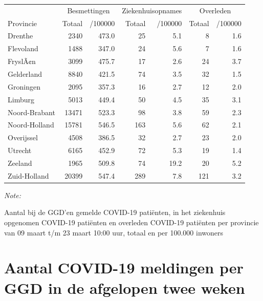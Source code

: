 \documentclass[
  english,
  man,floatsintext]{apa6}
\begin{document}
\begin{table}
\centering
\begin{threeparttable}
\begin{tabular}{lrrrrrr}
\toprule
\multicolumn{1}{c}{ } & \multicolumn{2}{c}{Besmettingen} & \multicolumn{2}{c}{Ziekenhuisopnames} & \multicolumn{2}{c}{Overleden} \\
\cmidrule(l{3pt}r{3pt}){2-3} \cmidrule(l{3pt}r{3pt}){4-5} \cmidrule(l{3pt}r{3pt}){6-7}
Provincie & Totaal & /100000 & Totaal & /100000 & Totaal & /100000\\
\midrule
Drenthe & 2340 & 473.0 & 25 & 5.1 & 8 & 1.6\\
Flevoland & 1488 & 347.0 & 24 & 5.6 & 7 & 1.6\\
FryslÃ¢n & 3099 & 475.7 & 17 & 2.6 & 24 & 3.7\\
Gelderland & 8840 & 421.5 & 74 & 3.5 & 32 & 1.5\\
Groningen & 2095 & 357.3 & 16 & 2.7 & 12 & 2.0\\
Limburg & 5013 & 449.4 & 50 & 4.5 & 35 & 3.1\\
Noord-Brabant & 13471 & 523.3 & 98 & 3.8 & 59 & 2.3\\
Noord-Holland & 15781 & 546.5 & 163 & 5.6 & 62 & 2.1\\
Overijssel & 4508 & 386.5 & 32 & 2.7 & 23 & 2.0\\
Utrecht & 6165 & 452.9 & 72 & 5.3 & 19 & 1.4\\
Zeeland & 1965 & 509.8 & 74 & 19.2 & 20 & 5.2\\
Zuid-Holland & 20399 & 547.4 & 289 & 7.8 & 121 & 3.2\\
\bottomrule
\end{tabular}
\begin{tablenotes}
\item \textit{Note: } 
\item Aantal bij de GGD’en gemelde COVID-19 patiënten, in het ziekenhuis opgenomen COVID-19 patiënten en overleden COVID-19 patiënten per provincie van 09 maart t/m 23 maart 10:00 uur, totaal en per 100.000 inwoners
\end{tablenotes}
\end{threeparttable}
\end{table}

\newpage

\hypertarget{aantal-covid-19-meldingen-per-ggd-in-de-afgelopen-twee-weken}{%
\section{Aantal COVID-19 meldingen per GGD in de afgelopen twee weken}\label{aantal-covid-19-meldingen-per-ggd-in-de-afgelopen-twee-weken}}
\end{document}
